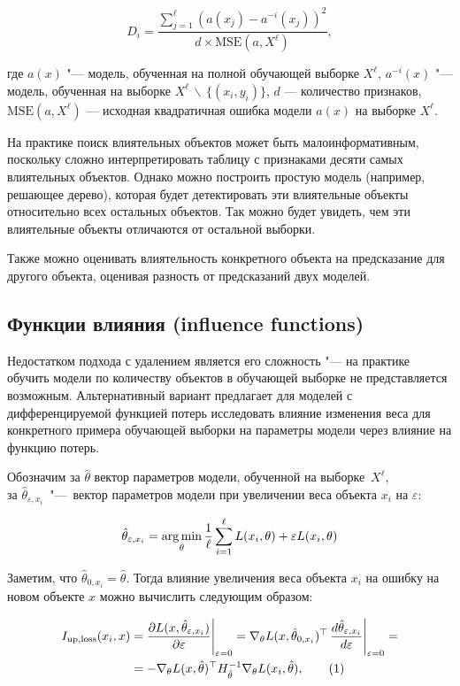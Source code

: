 \documentclass[12pt,a4paper]{article}
\begin{document}
$$
D_i = \frac{\sum_{j=1}^\ell (a(x_j) - a^{-i}(x_j))^2}{d \times \text{MSE}(a, X^\ell)},
$$

где $a(x)$ "--- модель, обученная на полной обучающей выборке $X^\ell$, $a^{-i}(x)$ "--- модель, обученная на выборке $X^\ell \, \backslash \, \{(x_i, y_i)\}$,  $d$ --- количество признаков, $\text{MSE}(a, X^\ell)$ --- исходная квадратичная ошибка модели $a(x)$ на выборке $X^\ell$.

На практике поиск влиятельных объектов может быть малоинформативным, поскольку сложно интерпретировать таблицу с признаками десяти самых влиятельных объектов. Однако можно построить простую модель (например, решающее дерево), которая будет детектировать эти влиятельные объекты относительно всех остальных объектов. Так можно будет увидеть, чем эти влиятельные объекты отличаются от остальной выборки.

Также можно оценивать влиятельность конкретного объекта на предсказание для другого объекта, оценивая разность от предсказаний двух моделей.

\subsection{Функции влияния (influence functions)}

Недостатком подхода с удалением является его сложность "--- на практике обучить модели по количеству объектов в обучающей выборке не представляется возможным. Альтернативный вариант предлагает для моделей с дифференцируемой функцией потерь исследовать влияние изменения веса для конкретного примера обучающей выборки на параметры модели через влияние на функцию потерь.

Обозначим за $\hat{\theta}$ вектор параметров модели, обученной на выборке~$X^\ell$, \\за $\hat{\theta}_{\varepsilon, x_i}$~"---~вектор параметров модели при увеличении веса объекта $x_i$ на $\varepsilon$:

$$
\hat{\theta}_{\varepsilon, x_i} = \mathop{\rm arg\,min}\limits_{\theta} \frac{1}{\ell} \sum_{i=1}^{\ell} L(x_i, \theta) + \varepsilon L(x_i, \theta)
$$

Заметим, что $\hat{\theta}_{0, x_i} = \hat{\theta}$. Тогда влияние увеличения веса объекта $x_i$ на ошибку на новом объекте $x$ можно вычислить следующим образом:

\begin{align}
I_{\text{up}, \text{loss}} (x_i, x)
& = \frac{ \partial L(x, \hat{\theta}_{\varepsilon, x_i})}{\partial \varepsilon} \Bigg|_{\varepsilon = 0}
= \nabla_\theta L(x, \hat{\theta}_{0,x_i})^\top \, \frac{d \hat{\theta}_{\varepsilon, x_i}}{d \varepsilon} \Bigg|_{\varepsilon = 0} \notag =\\
& = - \nabla_\theta L(x, \hat{\theta})^\top H_{\hat{\theta}}^{-1} \nabla_\theta L(x_i, \hat{\theta}), \tag{1} \label{up_loss}
\end{align}
\end{document}
